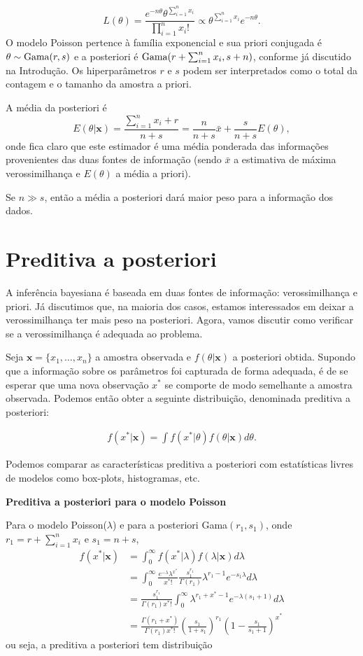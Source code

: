 \documentclass[
  letterpaper,
  DIV=11,
  numbers=noendperiod]{scrreprt}
\theoremstyle{definition}
\theoremstyle{plain}
\theoremstyle{definition}
\theoremstyle{remark}
\begin{document}
\[L(\theta)=\frac{e^{-n\theta}\theta^{\sum_{i=1}^{n}x_i}}{\prod_{i=1}^{n}x_i!}\propto \theta^{\sum_{i=1}^n x_i}e^{-n\theta}.\]
O modelo Poisson pertence à família exponencial e sua priori conjugada é
\(\theta\sim\hbox{Gama}(r,s)\) e a posteriori é
\(\hbox{Gama}(r+\sum_{i=1}^n x_i, s+n)\), conforme já discutido na
Introdução. Os hiperparâmetros \(r\) e \(s\) podem ser interpretados
como o total da contagem e o tamanho da amostra a priori.

A média da posteriori é
\[E(\theta|\mathbf{x})=\frac{\sum_{i=1}^{n}x_i+r}{n+s}=\frac{n}{n+s}\bar{x}+\frac{s}{n+s}E(\theta),\]
onde fica claro que este estimador é uma média ponderada das informações
provenientes das duas fontes de informação (sendo \(\bar{x}\) a
estimativa de máxima verossimilhança e \(E(\theta)\) a média a priori).

Se \(n\gg s\), então a média a posteriori dará maior peso para a
informação dos dados.

\section{Preditiva a posteriori}\label{preditiva-a-posteriori}

A inferência bayesiana é baseada em duas fontes de informação:
verossimilhança e priori. Já discutimos que, na maioria dos casos,
estamos interessados em deixar a verossimilhança ter mais peso na
posteriori. Agora, vamos discutir como verificar se a verossimilhança é
adequada ao problema.

Seja \(\boldsymbol{x}=\{x_1,\ldots,x_n\}\) a amostra observada e
\(f(\theta|\boldsymbol{x})\) a posteriori obtida. Supondo que a
informação sobre os parâmetros foi capturada de forma adequada, é de se
esperar que uma nova observação \(x^*\) se comporte de modo semelhante a
amostra observada. Podemos então obter a seguinte distribuição,
denominada preditiva a posteriori:

\[\begin{align}f(x^*|\boldsymbol{x})=\int f(x^*|\theta)f(\theta|\boldsymbol{x})d\theta.\end{align}\]

Podemos comparar as características preditiva a posteriori com
estatísticas livres de modelos como box-plots, histogramas, etc.

\textbf{Preditiva a posteriori para o modelo Poisson}

Para o modelo Poisson(\(\lambda\)) e para a posteriori
Gama\((r_1,s_1)\), onde \(r_1=r+\sum_{i=1}^n x_i\) e \(s_1=n+s\),
\[\begin{align}
f(x^*|\boldsymbol{x})&=\int_0^\infty f(x^*|\lambda)f(\lambda|\boldsymbol{x})d\lambda\\
&=\int_0^\infty\frac{e^{-\lambda}\lambda^{x^*}}{x^*!}\frac{s_1^{r_1}}{\Gamma(r_1)}\lambda^{r_1-1}e^{-s_1\lambda}d\lambda\\
&=\frac{s_1^{r_1}}{\Gamma(r_1)x^*!}\int_0^\infty \lambda^{r_1+x^*-1}e^{-\lambda(s_1+1)}d\lambda\\
&=\frac{\Gamma(r_1+x^*)}{\Gamma(r_1)x^*!}\left(\frac{s_1}{1+s_1}\right)^{r_1}\left(1 - \frac{s_1}{s_1+1}\right)^{x^*}
\end{align}\] ou seja, a preditiva a posteriori tem distribuição
\end{document}
